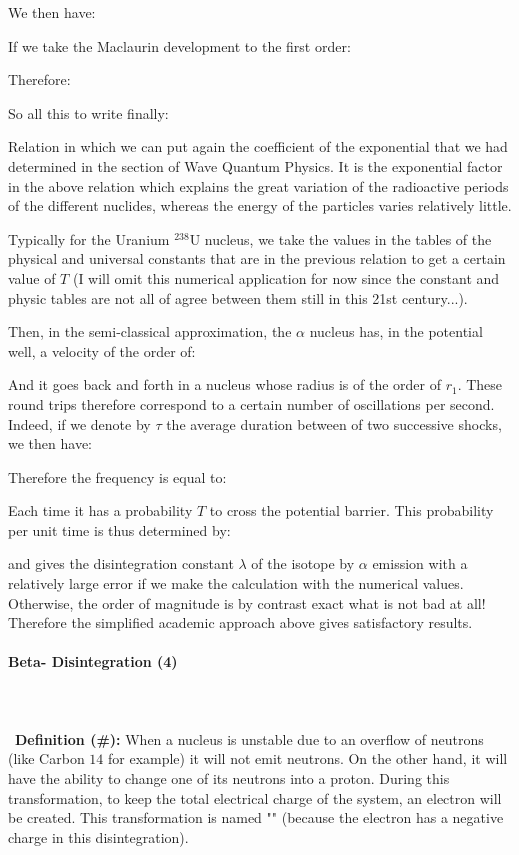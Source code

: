 	We then have:
	
	If we take the Maclaurin development to the first order:
	
	Therefore:
	
	So all this to write finally:
	
	Relation in which we can put again the coefficient of the exponential that we had determined in the section of Wave Quantum Physics. It is the exponential factor in the above relation which explains the great variation of the radioactive periods of the different nuclides, whereas the energy of the particles varies relatively little.
	
	Typically for the Uranium $^{238}\mathrm{U}$ nucleus, we take the values in the tables of the physical and universal constants that are in the previous relation to get a certain value of $T$ (I will omit this numerical application for now since the constant and physic tables are not all of agree between them still in this 21st century...).
	
	Then, in the semi-classical approximation, the $\alpha$ nucleus has, in the potential well, a velocity of the order of:
	
	And it goes back and forth in a nucleus whose radius is of the order of $r_1$. These round trips therefore correspond to a certain number of oscillations per second. Indeed, if we denote by $\tau$ the average duration between of two successive shocks, we then have:
	
	Therefore the frequency is equal to:
	
	Each time it has a probability $T$ to cross the potential barrier. This probability per unit time is thus determined by:
	
	and gives the disintegration constant $\lambda$ of the isotope by $\alpha$ emission with a relatively large error if we make the calculation with the numerical values. Otherwise, the order of magnitude is by contrast exact what is not bad at all! Therefore the simplified academic approach above gives satisfactory results.
	
	\pagebreak
	\paragraph{Beta- Disintegration (4)}\mbox{}\\\\\
	\textbf{Definition (\#\mydef):} When a nucleus is unstable due to an overflow of neutrons (like Carbon $14$ for example) it will not emit neutrons. On the other hand, it will have the ability to change one of its neutrons into a proton. During this transformation, to keep the total electrical charge of the system, an electron will be created. This transformation is named "" (because the electron has a negative charge in this disintegration).
	
